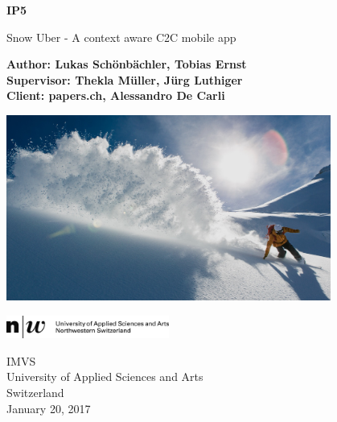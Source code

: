 \documentclass[11pt]{article} %
\begin{document}
\begin{titlepage}
    \begin{center}
        \vspace*{1cm}
        
        \Huge
        \textbf{IP5}
        
        \vspace{0.5cm}
        \LARGE
        Snow Uber - A context aware C2C mobile app
      
        \vspace{1.5cm}
        
        \textbf{Author: Lukas Schönbächler, Tobias Ernst}\\
        \textbf{Supervisor: Thekla Müller, Jürg Luthiger}\\
        \textbf{Client: papers.ch, Alessandro De Carli}

		\vspace{1.5cm}        
        
        \includegraphics[width=0.8\textwidth]{title/title}
        
        \vfill
        
       
        \vspace{0.8cm}
        
        \includegraphics[width=0.4\textwidth]{title/fhnw}
        
        \Large
        IMVS\\
        University of Applied Sciences and Arts\\
        Switzerland\\
       January 20, 2017
        
    \end{center}
\end{titlepage}
\end{document}
